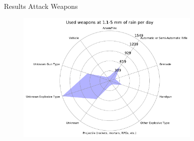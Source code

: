 \documentclass{beamer}
\begin{document}
\begin{frame}{Results}
	Attack Weapons
	
	\begin{figure}
		\includegraphics[width=0.8\textwidth]{Rain-Weapon/rain11-5_starDiagram}
	\end{figure}
	
\end{frame}
\end{document}
